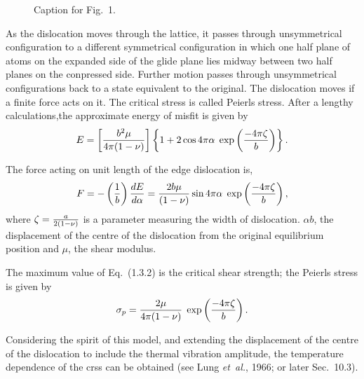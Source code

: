 \begin{figure}%
{}
\caption{Caption for Fig.~1.}
\end{figure}

As the dislocation moves through the lattice, it passes through 
unsymmetrical configuration to a different symmetrical configuration 
in which one half plane of atoms on the expanded side of the glide 
plane lies midway between two half planes on the conpressed side. 
Further motion passes through unsymmetrical configurations back to a 
state equivalent to the original. The dislocation moves if a finite 
force acts on it. The critical stress is called Peierls stress. After 
a lengthy calculations,the approximate energy of misfit is given by
\begin{equation}
E=\left[{{b^2 \mu} \over {4 \pi (1 - \nu)}}\right] 
\left\{ 1 + 2 \cos 4 \pi \alpha \; \exp 
\left({{-4 \pi \zeta} \over b}\right) \right\}.
\end{equation}

The force acting on unit length of the edge dislocation is,
\begin{equation}
F=-\left({1\over b}\right){dE\over {d\alpha}} = {{2b \mu} \over {(1- \nu)}} 
\sin 4 \pi \alpha \; \exp \left({{-4 \pi \zeta} \over b}\right),
\end{equation}
where $\zeta = {a \over {2 (1- \nu)}}$ is a parameter measuring the 
width of dislocation. $\alpha b$, the displacement of the centre of 
the dislocation from the original equilibrium position and $\mu$, the 
shear modulus.

The maximum value of Eq.~(1.3.2) is the critical shear strength; the 
Peierls stress is given by
\begin{equation}
\sigma_p = { {2 \mu} \over {4 \pi (1- \nu)}} \; \exp \left({{-4 \pi \zeta} 
\over b}\right).
\end{equation}

Considering the spirit of this model, and extending the 
displacement of the centre of the dislocation to include the thermal 
vibration amplitude, the temperature dependence of the crss can be 
obtained (see Lung {\it et~al.}, 1966; or later Sec.~10.3).





